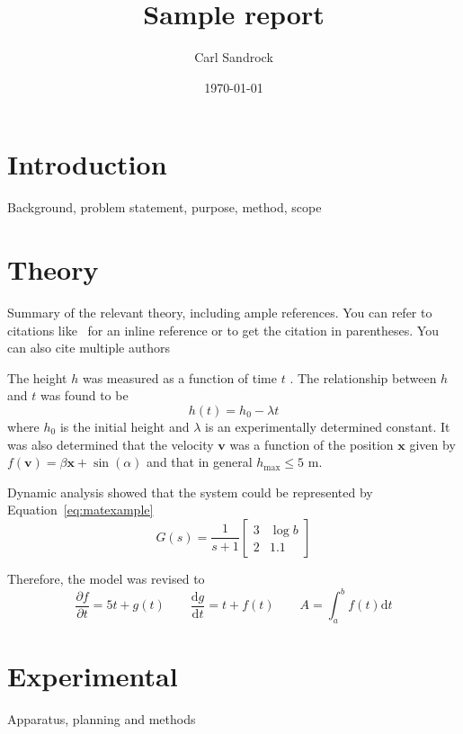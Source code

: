 \documentclass[a4paper,12pt]{article}
\title{Sample report}
\author{Carl Sandrock}
\date{\today}
\newcommand{\nomunit}[1]{%
\renewcommand{\nomentryend}{\hspace*{\fill}#1}}
\begin{document}


\section{Introduction}
Background, problem statement, purpose, method, scope

\section{Theory}
Summary of the relevant theory, including ample references. You can refer to citations like~\citep{bruckmanmandersloot} for an inline reference or \citep{bruckmanmandersloot} to get the citation in parentheses. You can also cite multiple authors~\citep{mandersloot,bruckmanmandersloot}

The height $h$ \nomenclature{h}{Height \nomunit{m}} was measured as a function of time $t$ \nomenclature{t}{time \nomunit{s}}.  The relationship between $h$ and $t$ was found to be 
\begin{equation}
  \label{eq:commaexample}
  h(t) = h_0 - \lambda t
\end{equation}
where $h_0$ is the initial height and $\lambda$ is an experimentally
determined constant.  It was also determined that the velocity
$\mathbf{v}$ was a function of the position $\mathbf{x}$ given by
$f(\mathbf{v}) = \beta \mathbf{x} + \sin(\alpha)$ and that in general
$h_{\mathrm{max}} \leq 5$ m.

Dynamic analysis showed that the system could be represented by
Equation~\ref{eq:matexample}
\begin{equation}
  \label{eq:matexample}
  G(s) = \frac{1}{s+1}\left [ 
    \begin{array}{cc} 
      3 & \log{b} \\ 
      2 & \num{1.1} 
    \end{array} \right ]
\end{equation}

Therefore, the model was revised to
\begin{equation}
  \frac{\partial f}{\partial t} = 5t + g(t) \qquad \frac{\mathrm{d} g}{\mathrm{d} t} = t + f(t) \qquad A = \int_a^b f(t) \mathrm{d} t
\end{equation}


\section{Experimental}
Apparatus, planning and methods
\end{document}
